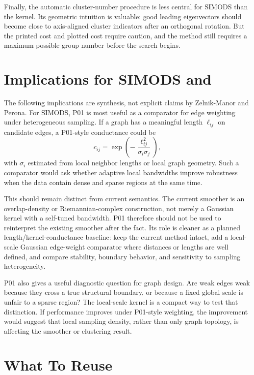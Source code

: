 \documentclass[11pt]{article}
\begin{document}
Finally, the automatic cluster-number procedure is less central for SIMODS
than the kernel. Its geometric intuition is valuable: good leading
eigenvectors should become close to axis-aligned cluster indicators after an
orthogonal rotation. But the printed cost and plotted cost require caution,
and the method still requires a maximum possible group number before the
search begins.

\section{Implications for SIMODS and }

The following implications are synthesis, not explicit claims by
Zelnik-Manor and Perona. For SIMODS, P01 is most useful as a comparator for
edge weighting under heterogeneous sampling. If a graph has a meaningful
length \(\ell_{ij}\) on candidate edges, a P01-style conductance could be
\[
  c_{ij}
  =
  \exp\left(-\frac{\ell_{ij}^2}{\sigma_i\sigma_j}\right),
\]
with \(\sigma_i\) estimated from local neighbor lengths or local graph
geometry. Such a comparator would ask whether adaptive local bandwidths
improve robustness when the data contain dense and sparse regions at the same
time.

This should remain distinct from current 
semantics. The current  smoother is an overlap-density or
Riemannian-complex construction, not merely a Gaussian kernel with a
self-tuned bandwidth. P01 therefore should not be used to reinterpret the
existing smoother after the fact. Its role is cleaner as a planned
length/kernel-conductance baseline: keep the current method intact, add a
local-scale Gaussian edge-weight comparator where distances or lengths are
well defined, and compare stability, boundary behavior, and sensitivity to
sampling heterogeneity.

P01 also gives a useful diagnostic question for graph design. Are weak edges
weak because they cross a true structural boundary, or because a fixed global
scale is unfair to a sparse region? The local-scale kernel is a compact way to
test that distinction. If performance improves under P01-style weighting, the
improvement would suggest that local sampling density, rather than only graph
topology, is affecting the smoother or clustering result.

\section{What To Reuse}
\end{document}

